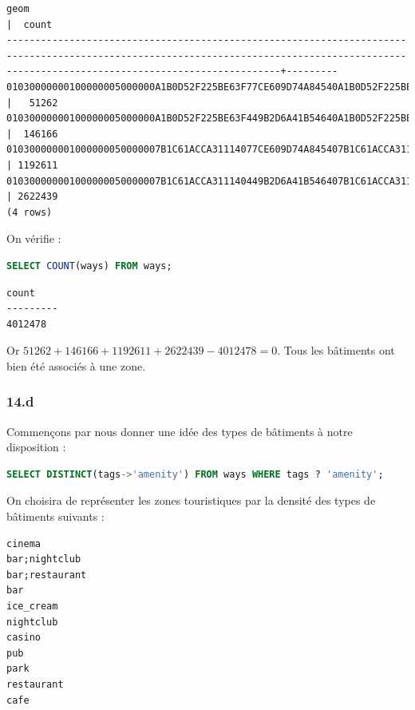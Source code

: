 \documentclass[12pt,a4paper]{article}
\begin{document}
\begin{lstlisting}
geom                                                                                            |  count  
--------------------------------------------------------------------------------------------------------------------------------------------------------------------------------------------+---------
01030000000100000005000000A1B0D52F225BE63F77CE609D74A84540A1B0D52F225BE63F449B2D6A41B546407B1C61ACCA311140449B2D6A41B546407B1C61ACCA31114077CE609D74A84540A1B0D52F225BE63F77CE609D74A84540 |   51262
01030000000100000005000000A1B0D52F225BE63F449B2D6A41B54640A1B0D52F225BE63F1168FA360EC247407B1C61ACCA3111401168FA360EC247407B1C61ACCA311140449B2D6A41B54640A1B0D52F225BE63F449B2D6A41B54640 |  146166
010300000001000000050000007B1C61ACCA31114077CE609D74A845407B1C61ACCA311140449B2D6A41B54640E282C71231981F40449B2D6A41B54640E282C71231981F4077CE609D74A845407B1C61ACCA31114077CE609D74A84540 | 1192611
010300000001000000050000007B1C61ACCA311140449B2D6A41B546407B1C61ACCA3111401168FA360EC24740E282C71231981F401168FA360EC24740E282C71231981F40449B2D6A41B546407B1C61ACCA311140449B2D6A41B54640 | 2622439
(4 rows)
\end{lstlisting}

On vérifie :

\begin{lstlisting}[language=SQL]
SELECT COUNT(ways) FROM ways;
\end{lstlisting}

\begin{lstlisting}
count  
---------
4012478
\end{lstlisting}

Or $51262 + 146166 + 1192611 + 2622439 - 4012478 = 0$. Tous les bâtiments ont
bien été associés à une zone.

\subsubsection*{14.d}

Commençons par nous donner une idée des types de bâtiments à notre disposition :

\begin{lstlisting}[language=SQL]
SELECT DISTINCT(tags->'amenity') FROM ways WHERE tags ? 'amenity';
\end{lstlisting}

On choisira de représenter les zones touristiques par la densité des types de
bâtiments suivants :

\begin{lstlisting}
cinema
bar;nightclub
bar;restaurant
bar
ice_cream
nightclub
casino
pub
park
restaurant
cafe
\end{lstlisting}
\end{document}

